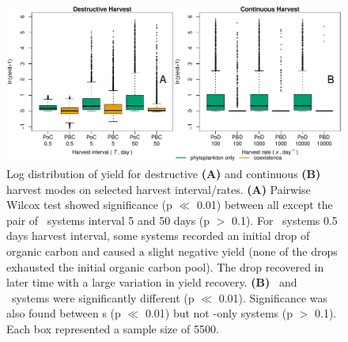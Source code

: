 \documentclass[../thesis.tex]{subfiles} %
\begin{document}
\begin{figure}[H]
    \centering
    \includegraphics[width=\linewidth]{result/Harvest.pdf}
    \caption[Yield flux distribution by harvest mode]{Log distribution of yield for destructive \textbf{(A)} and continuous \textbf{(B)} harvest modes on selected harvest interval/rates.  \textbf{(A)} Pairwise Wilcox test showed significance (p $\ll$ 0.01) between all except the pair of \PoN\ systems interval 5 and 50 days (p $>$ 0.1).  For \PBN\ systems 0.5 days harvest interval, some systems recorded an initial drop of organic carbon and caused a slight negative yield (none of the drops exhausted the initial organic carbon pool).  The drop recovered in later time with a large variation in yield recovery.  \textbf{(B)} \PoH\ and \PBH\ systems were significantly different (p $\ll$ 0.01).  Significance was also found between \pbs s (p $\ll$ 0.01) but not \phy-only systems (p $>$ 0.1).  Each box represented a sample size of 5500.}
    \label{f:ydByHarv}
\end{figure}
\end{document}
